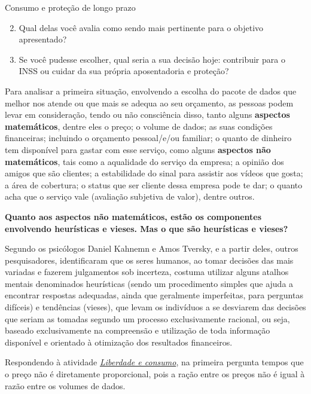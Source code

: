 \begin{task}{Consumo e proteção de longo prazo}
\begin{enumerate}\setcounter{enumi}{1}
  \item Qual delas você avalia como sendo mais pertinente para o objetivo apresentado?
  \item Se você pudesse escolher, qual seria a sua decisão hoje: contribuir para o INSS ou cuidar da sua própria aposentadoria e proteção?
\end{enumerate}
\end{task}

\label{fin-arg-9}

Para analisar a primeira situação, envolvendo a escolha do pacote de dados que melhor nos atende ou que mais se adequa ao seu orçamento, as pessoas podem levar em consideração, tendo ou não consciência disso, tanto alguns \textbf{aspectos matemáticos}, dentre eles o preço; o volume de dados; as suas condições financeiras; incluindo o orçamento pessoal/e/ou familiar; o quanto de dinheiro tem disponível para gastar com esse serviço, como alguns \textbf{aspectos não matemáticos}, tais como a aqualidade do serviço da empresa; a opinião dos amigos que são clientes; a estabilidade do sinal para assistir aos vídeos que gosta; a área de cobertura; o status que ser cliente dessa empresa pode te dar; o quanto acha que o serviço vale (avaliação subjetiva de valor), dentre outros. 

\textbf{Quanto aos aspectos não matemáticos, estão os componentes envolvendo heurísticas e vieses. Mas o que são heurísticas e vieses?}

Segundo os psicólogos Daniel Kahnemn e Amos Tversky, e a partir deles, outros pesquisadores, identificaram que os seres humanos, ao tomar decisões das mais variadas e fazerem julgamentos sob incerteza, costuma utilizar alguns atalhos mentais denominados heurísticas (sendo um procedimento simples que ajuda a encontrar respostas adequadas, ainda que geralmente imperfeitas, para perguntas difíceis) e tendências (vieses), que levam os indivíduos a se desviarem das decisões que seriam as tomadas segundo um processo exclusivamente racional, ou seja, baseado exclusivamente na compreensão e utilização de toda informação disponível e orientado à otimização dos resultados financeiros.

Respondendo à atividade \hyperref[fin-ativ-37]{\textit{Liberdade e consumo}}, na primeira pergunta tempos que o preço não é diretamente proporcional, pois a ração entre os preços não é igual à razão entre os volumes de dados.

